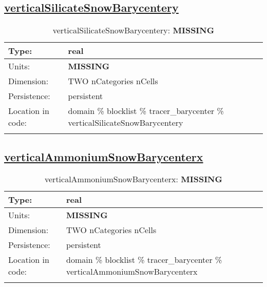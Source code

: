 \subsection[verticalSilicateSnowBarycentery]{\hyperref[sec:var_tab_tracer_barycenter]{verticalSilicateSnowBarycentery}}
\label{subsec:var_sec_tracer_barycenter_verticalSilicateSnowBarycentery}
\begin{center}
\begin{longtable}{| p{2.0in} | p{4.0in} |}
        \hline 
        Type: & real \\
        \hline 
        Units: & {\bf \color{red} MISSING} \\
        \hline 
        Dimension: & TWO nCategories nCells \\
        \hline 
        Persistence: & persistent \\
        \hline 
         Location in code: & domain \% blocklist \% tracer\_barycenter \% verticalSilicateSnowBarycentery \\
         \hline 
    \caption{verticalSilicateSnowBarycentery: {\bf \color{red} MISSING}}
\end{longtable}
\end{center}
\subsection[verticalAmmoniumSnowBarycenterx]{\hyperref[sec:var_tab_tracer_barycenter]{verticalAmmoniumSnowBarycenterx}}
\label{subsec:var_sec_tracer_barycenter_verticalAmmoniumSnowBarycenterx}
\begin{center}
\begin{longtable}{| p{2.0in} | p{4.0in} |}
        \hline 
        Type: & real \\
        \hline 
        Units: & {\bf \color{red} MISSING} \\
        \hline 
        Dimension: & TWO nCategories nCells \\
        \hline 
        Persistence: & persistent \\
        \hline 
         Location in code: & domain \% blocklist \% tracer\_barycenter \% verticalAmmoniumSnowBarycenterx \\
         \hline 
    \caption{verticalAmmoniumSnowBarycenterx: {\bf \color{red} MISSING}}
\end{longtable}
\end{center}
